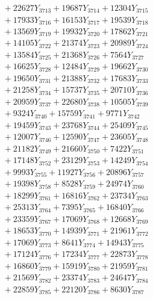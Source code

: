 \documentclass[a4paper,10pt]{article}
\begin{document}
{\begin{align}
&\;  + 22627 Y_{3713} + 19687 Y_{3714} + 12304 Y_{3715} \\[0.3ex]
&\;  + 17933 Y_{3716} + 16153 Y_{3717} + 19539 Y_{3718} \\[0.5ex]\allowbreak
&\;  + 13569 Y_{3719} + 19932 Y_{3720} + 17862 Y_{3721} \\[0.3ex]
&\;  + 14105 Y_{3722} + 21374 Y_{3723} + 20989 Y_{3724} \\[0.3ex]
&\;  + 13584 Y_{3725} + 21368 Y_{3726} + 7564 Y_{3727} \\[0.3ex]
&\;  + 16625 Y_{3728} + 12484 Y_{3729} + 19662 Y_{3730} \\[0.3ex]
&\;  + 19650 Y_{3731} + 21388 Y_{3732} + 17683 Y_{3733} \\[0.3ex]
&\;  + 21258 Y_{3734} + 15737 Y_{3735} + 20710 Y_{3736} \\[0.3ex]
&\;  + 20959 Y_{3737} + 22680 Y_{3738} + 10505 Y_{3739} \\[0.3ex]
&\;  + 9324 Y_{3740} + 15759 Y_{3741} + 9771 Y_{3742} \\[0.3ex]
&\;  + 19459 Y_{3743} + 23768 Y_{3744} + 25409 Y_{3745} \\[0.3ex]
&\;  + 12007 Y_{3746} + 12590 Y_{3747} + 23605 Y_{3748} \\[0.5ex]\allowbreak
&\;  + 21182 Y_{3749} + 21660 Y_{3750} + 7422 Y_{3751} \\[0.3ex]
&\;  + 17148 Y_{3752} + 23129 Y_{3753} + 14249 Y_{3754} \\[0.3ex]
&\;  + 9993 Y_{3755} + 11927 Y_{3756} + 20896 Y_{3757} \\[0.3ex]
&\;  + 19398 Y_{3758} + 8528 Y_{3759} + 24974 Y_{3760} \\[0.3ex]
&\;  + 18299 Y_{3761} + 16816 Y_{3762} + 23734 Y_{3763} \\[0.3ex]
&\;  + 25313 Y_{3764} + 7395 Y_{3765} + 16840 Y_{3766} \\[0.3ex]
&\;  + 23359 Y_{3767} + 17069 Y_{3768} + 12668 Y_{3769} \\[0.3ex]
&\;  + 18653 Y_{3770} + 14939 Y_{3771} + 21961 Y_{3772} \\[0.3ex]
&\;  + 17069 Y_{3773} + 8641 Y_{3774} + 14943 Y_{3775} \\[0.3ex]
&\;  + 17124 Y_{3776} + 17234 Y_{3777} + 22873 Y_{3778} \\[0.5ex]\allowbreak
&\;  + 16860 Y_{3779} + 15919 Y_{3780} + 21959 Y_{3781} \\[0.3ex]
&\;  + 21569 Y_{3782} + 23374 Y_{3783} + 24647 Y_{3784} \\[0.3ex]
&\;  + 22859 Y_{3785} + 22120 Y_{3786} + 8630 Y_{3787} \\[0.3ex]

\end{align}}
\end{document}
